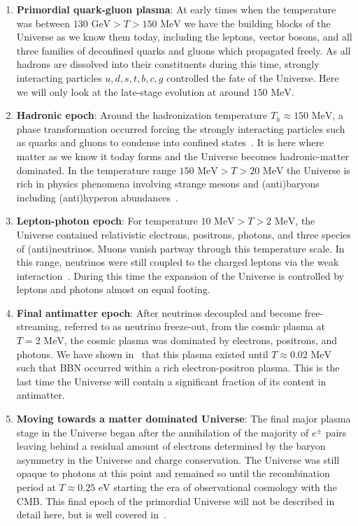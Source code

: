 \documentclass[universe,article,submit,moreauthors,pdftex,a4paper]{Definitions/mdpi}
\newcommand{\GeV}{\text{ GeV}}
\newcommand{\MeV}{\text{ MeV}}
\newcommand{\eV}{\text{ eV}}
\begin{document}
\begin{enumerate}
    \item \textbf{Primordial quark-gluon plasma}: At early times when the temperature was between $130\GeV>T>150\MeV$ we have the building blocks of the Universe as we know them today, including the leptons, vector bosons, and all three families of deconfined quarks and gluons which propagated freely. As all hadrons are dissolved into their constituents during this time, strongly interacting particles $u,d,s,t,b,c,g$ controlled the fate of the Universe. Here we will only look at the late-stage evolution at around $150\MeV$.
    \item \textbf{Hadronic epoch}: Around the hadronization temperature $T_h\approx150\MeV$, a phase transformation occurred forcing the strongly interacting particles such as quarks and gluons to condense into confined states~\cite{Letessier:2005qe}. It is here where matter as we know it today forms and the Universe becomes hadronic-matter dominated. In the temperature range $ 150\MeV>T>20\MeV$ the Universe is rich in physics phenomena involving strange mesons and (anti)baryons including (anti)hyperon abundances~\cite{Fromerth:2012fe,Yang:2021bko}.
    \item \textbf{Lepton-photon epoch}: For temperature $10\MeV>T>2\MeV$, the Universe contained relativistic electrons, positrons, photons, and three species of (anti)neutrinos. Muons vanish partway through this temperature scale. In this range, neutrinos were still coupled to the charged leptons via the weak interaction~\cite{Birrell:2012gg,Birrell:2014ona}. During this time the expansion of the Universe is controlled by leptons and photons almost on equal footing.
    \item \textbf{Final antimatter epoch}: After neutrinos decoupled and become free-streaming, referred to as neutrino freeze-out, from the cosmic plasma at $T=2\MeV$, the cosmic plasma was dominated by electrons, positrons, and photons. We have shown in~\cite{Chris:2023abc} that this plasma existed until $T\approx0.02\MeV$ such that BBN occurred within a rich electron-positron plasma. This is the last time the Universe will contain a significant fraction of its content in antimatter.
    \item \textbf{Moving towards a matter dominated Universe}: The final major plasma stage in the Universe began after the annihilation of the majority of $e^{\pm}$ pairs leaving behind a residual amount of electrons determined by the baryon asymmetry in the Universe and charge conservation. The Universe was still opaque to photons at this point and remained so until the recombination period at $T\approx0.25\eV$ starting the era of observational cosmology with the CMB. This final epoch of the primordial Universe will not be described in detail here, but is well covered in~\cite{Planck:2018vyg}.
\end{enumerate}
\end{document}
